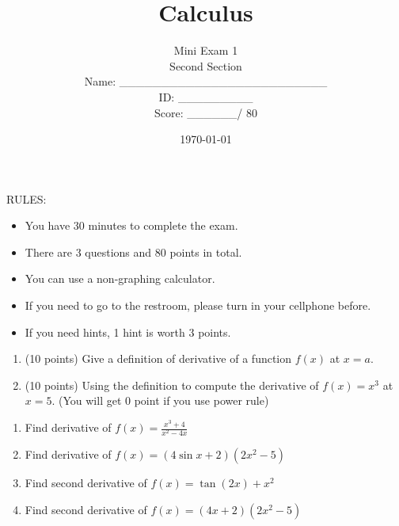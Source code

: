 \documentclass[12pt]{amsart}
\title{ Calculus }
\author{  Mini Exam 1 \\ Second Section \\ \vspace{1cm} Name: \_\_\_\_\_\_\_\_\_\_\_\_\_\_\_\_\_\_\_\_\_\_\_\_\_  
\\ \vspace{1cm} ID: \_\_\_\_\_\_\_\_\_ \\ \vspace{1cm} Score: \_\_\_\_\_\_/ 80}
\date{\today}
\begin{document}
\maketitle


RULES:
\begin{itemize}
	\item You have 30 minutes to complete the exam.
	\item There are 3 questions and 80 points in total.
	\item You can use a non-graphing calculator.
	\item If you need to go to the restroom, please turn in your cellphone before.
	\item If you need hints, 1 hint is worth 3 points.
\end{itemize}


\newpage

\begin{problem}[20 points]
\begin{enumerate}
	\item (10 points) Give a definition of derivative of a function $f(x)$ at $x = a$.
	      \vspace{9cm}
	\item (10 points) Using the definition to compute the derivative of $f(x) = x^3$ at $x = 5$.
	      (You will get 0 point if you use power rule)
	      \vspace{9cm}
\end{enumerate}
\end{problem}

\newpage

\begin{problem}[20 points]
\begin{enumerate}
	\item Find derivative of $\displaystyle f(x) = \frac{x^3 + 4}{x^2 - 4x}$
	      \vspace{10cm}
	\item Find derivative of $\displaystyle f(x) = (4\sin x + 2)(2x^2 - 5)$
	      \vspace{10cm}
	\item Find second derivative of $\displaystyle f(x) = \tan (2x)+ x^2$
	      \vspace{10cm}
	\item Find second derivative of $\displaystyle f(x) = (4x+ 2)(2x^2 - 5)$
	      \vspace{10cm}
\end{enumerate}
\end{problem}
\end{document}
